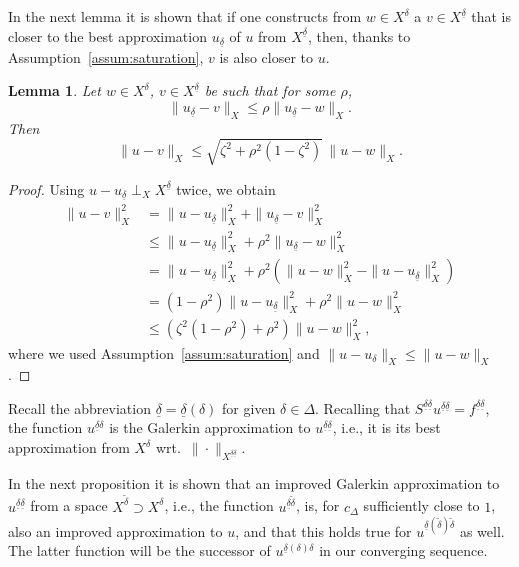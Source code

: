 \documentclass[11pt,a4paper,oneside,english]{amsart}
\numberwithin{equation}{section}
\numberwithin{theorem}{section}
\newtheorem{lemma}[theorem]{Lemma}
\theoremstyle{definition}
\newcommand{\udelta}{{\underline{\delta}}}
\newcommand{\jw}[1]{{\color{red}{JW: #1}}}
\begin{document}
In the next lemma it is shown that if one constructs from $w \in X^\delta$ a
$v \in X^\udelta$ that is closer to the best approximation $u_\udelta$ of $u$ from
$X^\udelta$, then, thanks to Assumption~\ref{assum:saturation}, $v$ is also closer to $u$.

\begin{lemma}
  Let $w \in X^\delta$, $v \in X^\udelta$ be such that for some $\rho$,
  \[
    \|u_\udelta-v\|_X \leq \rho \|u_\udelta-w\|_X.
  \]
  Then
  \[
    \|u-v\|_X \leq \sqrt{\zeta^2+\rho^2(1-\zeta^2)}\,\|u-w\|_X.
  \]
  \label{lem:closer-solution}
\end{lemma}
\begin{proof}
  Using $u-u_\udelta \perp_X X^\udelta$ twice, we obtain
  \begin{align*}
    \|u-v\|_X^2& =\|u-u_\udelta\|_X^2+\|u_\udelta-v\|_X^2\\
    &\leq \|u-u_\udelta\|_X^2+\rho^2 \|u_\udelta-w\|_X^2\\
    &=\|u-u_\udelta\|_X^2+\rho^2 (\|u-w\|_X^2-\|u-u_\udelta\|_X^2)\\
    &=(1-\rho^2)\|u-u_\udelta\|_X^2+\rho^2\|u-w\|_X^2\\
    &\leq (\zeta^2(1-\rho^2)+\rho^2)\|u-w\|_X^2,
  \end{align*}
  where we used Assumption~\ref{assum:saturation} and $\|u-u_\delta\|_X \leq \|u-w\|_X$.\jw{deze proof heb ik niet gecontroleerd}
\end{proof}

Recall the abbreviation $\udelta=\udelta(\delta)$ for given $\delta \in \Delta$.
Recalling that $S^{\udelta \udelta} u^{\udelta \udelta}=f^{\udelta \udelta}$,
the function $u^{\udelta \delta}$ is the Galerkin approximation to
$u^{\udelta \udelta}$, i.e., it is its best approximation from $X^\delta$
wrt.~$\|\cdot\|_{X^{\udelta \udelta}}$.

In the next proposition it is shown that an improved Galerkin approximation to
$u^{\udelta \udelta}$ from a space $X^{\tilde{\delta}} \supset X^\delta$, i.e.,
the function $u^{\udelta \tilde{\delta}}$, is, for $c_\Delta$ sufficiently close
to $1$, also an improved approximation to $u$, and that this holds true for
$u^{\udelta(\tilde{\delta}) \tilde{\delta}}$ as well. The latter function will be
the successor of $u^{\udelta(\delta) \delta}$ in our converging sequence.
\end{document}
